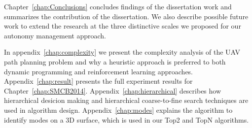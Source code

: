 Chapter~\ref{chap:Conclusions} concludes findings of the dissertation work and summarizes the contribution of the dissertation. 
We also describe possible future work to extend the research at the three distinctive scales we proposed for our autonomy management approach.

In appendix~\ref{chap:complexity} we present the complexity analysis of the UAV path planning problem and why a heuristic approach is preferred to both dynamic programming and reinforcement learning approaches. Appendix~\ref{chap:result} presents the full experiment results for Chapter~\ref{chap:SMCB2014}. Appendix~\ref{chap:hierarchical} describes how hierarchical desicion making and hierarchical coarse-to-fine search techniques are used in algorithm design. Appendix~\ref{chap:modes} explains the algorithm to identify modes on a 3D surface, which is used in our Top2 and TopN algorithms.